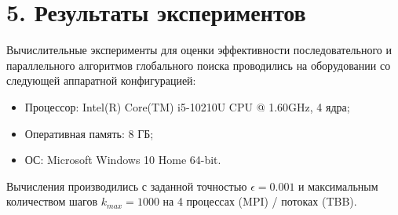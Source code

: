 \documentclass{report}
\begin{document}
\section*{5. Результаты экспериментов}
Вычислительные эксперименты для оценки эффективности последовательного и параллельного алгоритмов глобального поиска проводились на оборудовании со следующей аппаратной конфигурацией:

\begin{itemize}
\item Процессор: Intel(R) Core(TM) i5-10210U CPU @ 1.60GHz, 4 ядра;
\item Оперативная память: 8 ГБ;
\item ОС: Microsoft Windows 10 Home 64-bit.
\end{itemize}
Вычисления производились с заданной точностью $\epsilon = 0.001$ и максимальным количеством шагов $k_{max} = 1000$ на 4 процессах (MPI) / потоках (TBB).
\end{document}
